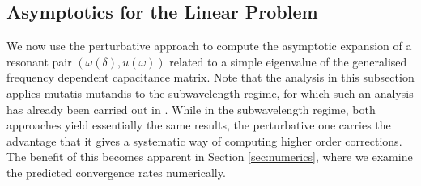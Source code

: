 \documentclass[a4paper,reqno,twoside]{amsart}
\numberwithin{equation}{section}
\theoremstyle{definition}
\newcommand{\<}{\ensuremath \leq}
\renewcommand{\>}{\ensuremath \geq}
\begin{document}
\subsection{Asymptotics for the Linear Problem}
We now use the perturbative approach to compute the asymptotic expansion of a resonant pair $(\omega(\delta),u(\omega))$ related to a simple eigenvalue of the generalised frequency dependent capacitance matrix. Note that the analysis in this subsection applies mutatis mutandis to the subwavelength regime, for which such an analysis has already been carried out in \cite{feppon2022modal}. While in the subwavelength regime, both approaches yield essentially the same results, the perturbative one carries the advantage that it gives a systematic way of computing higher order corrections. The benefit of this becomes apparent in Section \ref{sec:numerics}, where we examine the predicted convergence rates numerically. 
\end{document}
